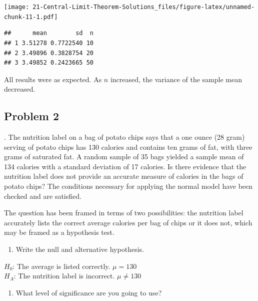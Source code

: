 \documentclass[
]{book}
\newenvironment{Shaded}{\begin{snugshade}}{\end{snugshade}}
\newcommand{\DataTypeTok}[1]{\textcolor[rgb]{0.13,0.29,0.53}{#1}}
\newcommand{\KeywordTok}[1]{\textcolor[rgb]{0.13,0.29,0.53}{\textbf{#1}}}
\newcommand{\NormalTok}[1]{#1}
\newcommand{\OperatorTok}[1]{\textcolor[rgb]{0.81,0.36,0.00}{\textbf{#1}}}
\newcommand{\StringTok}[1]{\textcolor[rgb]{0.31,0.60,0.02}{#1}}
\providecommand{\tightlist}{%
  \setlength{\itemsep}{0pt}\setlength{\parskip}{0pt}}
\begin{document}
\texttt{[image: 21-Central-Limit-Theorem-Solutions\_files/figure-latex/unnamed-chunk-11-1.pdf]}

\begin{Shaded}
\end{Shaded}

\begin{verbatim}
##      mean        sd  n
## 1 3.51278 0.7722540 10
## 2 3.49896 0.3828754 20
## 3 3.49852 0.2423665 50
\end{verbatim}

All results were as expected. As \(n\) increased, the variance of the sample mean decreased.

\hypertarget{problem-2-20}{%
\subsection{Problem 2}\label{problem-2-20}}

. The nutrition label on a bag of potato chips says that a one ounce (28 gram) serving of potato chips has 130 calories and contains ten grams of fat, with three grams of saturated fat. A random sample of 35 bags yielded a sample mean of 134 calories with a standard deviation of 17 calories. Is there evidence that the nutrition label does not provide an accurate measure of calories in the bags of potato chips? The conditions necessary for applying the normal model have been checked and are satisfied.

The question has been framed in terms of two possibilities: the nutrition label accurately lists the correct average calories per bag of chips or it does not, which may be framed as a hypothesis test.

\begin{enumerate}
\def\labelenumi{\alph{enumi}.}
\tightlist
\item
  Write the null and alternative hypothesis.
\end{enumerate}

\(H_0\): The average is listed correctly. \(\mu = 130\)\\
\(H_A\): The nutrition label is incorrect. \(\mu \neq 130\)

\begin{enumerate}
\def\labelenumi{\alph{enumi}.}
\setcounter{enumi}{1}
\tightlist
\item
  What level of significance are you going to use?
\end{enumerate}
\end{document}
